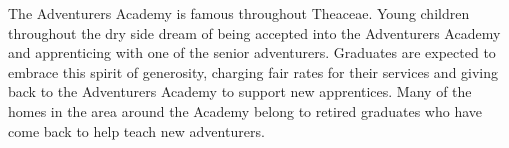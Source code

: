 The Adventurers Academy is famous throughout Theaceae.
Young children throughout the dry side dream of being accepted into the Adventurers Academy and apprenticing with one of the senior adventurers.
Graduates are expected to embrace this spirit of generosity, charging fair rates for their services and giving back to the Adventurers Academy to support new apprentices.
Many of the homes in the area around the Academy belong to retired graduates who have come back to help teach new adventurers.
